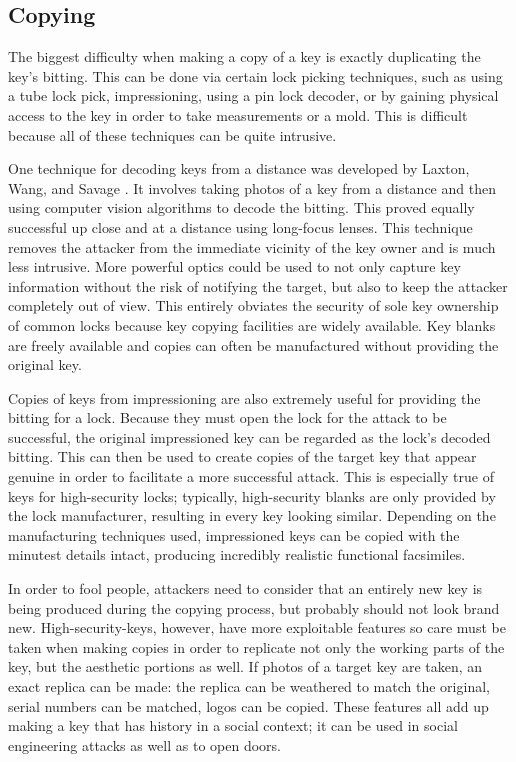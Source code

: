 \documentclass{acm_proc_article-sp}
\begin{document}
\subsection{Copying}
The biggest difficulty when making a copy of a key is exactly duplicating the key's bitting. This can be done via certain lock picking techniques, such as using a tube lock pick, impressioning, using a pin lock decoder, or by gaining physical access to the key in order to take measurements or a mold. This is difficult because all of these techniques can be quite intrusive.

One technique for decoding keys from a distance was developed by Laxton, Wang, and Savage \cite{LAXTON}. It involves taking photos of a key from a distance and then using computer vision algorithms to decode the bitting. This proved equally successful up close and at a distance using long-focus lenses. This technique removes the attacker from the immediate vicinity of the key owner and is much less intrusive. More powerful optics could be used to not only capture key information without the risk of notifying the target, but also to keep the attacker completely out of view. This entirely obviates the security of sole key ownership of common locks because key copying facilities are widely available. Key blanks are freely available and copies can often be manufactured without providing the original key.

Copies of keys from impressioning are also extremely useful for providing the bitting for a lock. Because they must open the lock for the attack to be successful, the original impressioned key can be regarded as the lock's decoded bitting. This can then be used to create copies of the target key that appear genuine in order to facilitate a more successful attack. This is especially true of keys for high-security locks; typically, high-security blanks are only provided by the lock manufacturer, resulting in every key looking similar. Depending on the manufacturing techniques used, impressioned keys can be copied with the minutest details intact, producing incredibly realistic functional facsimiles.

In order to fool people, attackers need to consider that an entirely new key is being produced during the copying process, but probably should not look brand new. High-security-keys, however, have more exploitable features so care must be taken when making copies in order to replicate not only the working parts of the key, but the aesthetic portions as well. If photos of a target key are taken, an exact replica can be made: the replica can be weathered to match the original, serial numbers can be matched, logos can be copied. These features all add up making a key that has history in a social context; it can be used in social engineering attacks as well as to open doors.
\end{document}
